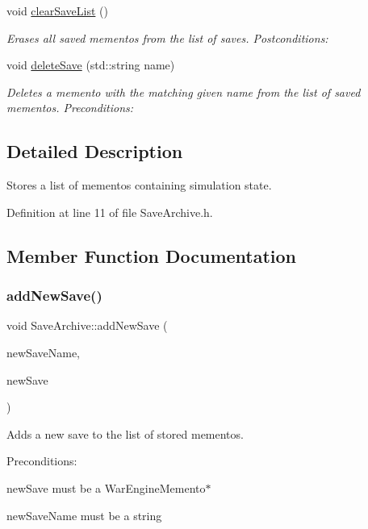 \begin{DoxyCompactItemize}
void \hyperlink{classSaveArchive_a70c8ccaf0ac543dd8d4474f2f6383b35}{clear\+Save\+List} ()
\begin{DoxyCompactList}\small\item\em Erases all saved mementos from the list of saves. Postconditions\+: \end{DoxyCompactList}\item 
void \hyperlink{classSaveArchive_a416beb211cd59fed04df7347ebe41f36}{delete\+Save} (std\+::string name)
\begin{DoxyCompactList}\small\item\em Deletes a memento with the matching given name from the list of saved mementos. Preconditions\+: \end{DoxyCompactList}\end{DoxyCompactItemize}


\subsection{Detailed Description}
Stores a list of mementos containing simulation state. 

Definition at line 11 of file Save\+Archive.\+h.



\subsection{Member Function Documentation}
\mbox{\label{classSaveArchive_ab6927785f5b7f07b079a424773796d49}} 
\subsubsection{\texorpdfstring{add\+New\+Save()}{addNewSave()}}
{\footnotesize\ttfamily void Save\+Archive\+::add\+New\+Save (\begin{DoxyParamCaption}\item[{std\+::string}]{new\+Save\+Name,  }\item[{\hyperlink{classWarEngineMemento}{War\+Engine\+Memento} $\ast$}]{new\+Save }\end{DoxyParamCaption})}



Adds a new save to the list of stored mementos. 

Preconditions\+:
\begin{DoxyItemize}
\item new\+Save must be a War\+Engine\+Memento$\ast$
\item new\+Save\+Name must be a string
\end{DoxyItemize}

